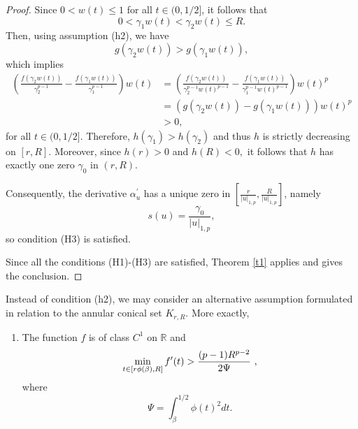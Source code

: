 \documentclass{birkjour}
\theoremstyle{definition}
\theoremstyle{remark}
\numberwithin{equation}{section}
\begin{document}
\begin{proof}
Since $0<w(t)\leq 1$ for all $t\in (0,1/2]$, it follows that
\begin{equation*}
0<\gamma _{1}w(t)<\gamma _{2}w(t)\leq R.
\end{equation*}%
Then, using assumption (h2), we have
\begin{equation*}
g(\gamma _{2}w(t))>g(\gamma _{1}w(t)),
\end{equation*}%
which implies
\begin{align*}
\left( \frac{f(\gamma _{2}w(t))}{\gamma _{2}^{p-1}}-\frac{f(\gamma _{1}w(t))%
}{\gamma _{1}^{p-1}}\right) w(t)& =\left( \frac{f(\gamma _{2}w(t))}{\gamma
_{2}^{p-1}w(t)^{p-1}}-\frac{f(\gamma _{1}w(t))}{\gamma _{1}^{p-1}w(t)^{p-1}}%
\right) w(t)^{p} \\
& =\left( g(\gamma _{2}w(t))-g(\gamma _{1}w(t))\right) w(t)^{p} \\
& >0,
\end{align*}%
for all $t\in (0,1/2]$. Therefore, $h\left( \gamma _{1}\right) >h\left(
\gamma _{2}\right) $ and thus $h$ is strictly decreasing on $\left[ r,R%
\right] .$ Moreover, since $h\left( r\right) >0$ and $h\left( R\right) <0,$
it follows that $h$ has exactly one zero $\gamma _{0}$ in $\left( r,R\right)
.$

Consequently, the derivative $\alpha _{u}^{\prime }$ has a unique zero in $%
\left[ \frac{r}{\left\vert u\right\vert _{1,p}},\frac{R}{\left\vert
u\right\vert _{1,p}}\right] $, namely
\begin{equation*}
s(u)=\frac{\gamma _{0}}{|u|_{1,p}},
\end{equation*}
so condition (H3) is satisfied.

Since all the conditions (H1)-(H3) are satisfied, Theorem \ref{t1} applies
and gives the conclusion.
\end{proof}

Instead of condition (h2), we may consider an alternative assumption
formulated in relation to the annular conical set $K_{r,R}$. More exactly,

\begin{enumerate}
\item[\textbf{(h2')}] The function $f$ is of class $C^{1}$ on $\mathbb{R}$
and
\begin{equation}
\min_{t\in \lbrack r\phi (\beta ),R]}f^{\prime }(t)>\frac{(p-1)R^{p-2}}{%
2\Psi }\text{ },  \label{ider}
\end{equation}%
where
\begin{equation*}
\Psi =\int_{\beta }^{1/2}\phi (t)^{2}dt.
\end{equation*}
\end{enumerate}
\end{document}
